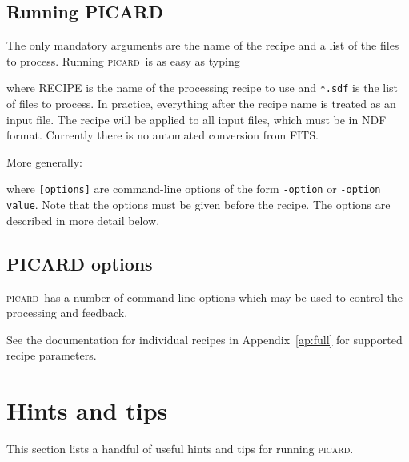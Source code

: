\documentclass[twoside,11pt,nolof]{starlink}
\providecommand{\picard}{\textsc{picard}}
\providecommand{\task}[1]{\textsf{#1}}
\begin{document}
\subsection{Running PICARD}

The only mandatory arguments are the name of the recipe and a list of
the files to process. Running \picard\ is as easy as typing
\begin{terminalv}
\end{terminalv}
where \task{RECIPE} is the name of the processing recipe to use and
\verb+*.sdf+ is the list of files to process. In practice, everything
after the recipe name is treated as an input file. The recipe will be
applied to all input files, which must be in NDF format. Currently
there is no automated conversion from FITS.

More generally:
\begin{terminalv}
\end{terminalv}
where \verb+[options]+ are command-line options of the form
\verb+-option+ or \verb+-option value+.  Note that the options must be
given before the recipe. The options are described in more detail
below.

\subsection{PICARD options}

\picard\ has a number of command-line options which may be used to
control the processing and feedback.



See the documentation for individual recipes in Appendix~\ref{ap:full}
for supported recipe parameters.

\section{Hints and tips\label{se:hints}}

This section lists a handful of useful hints and tips for running
\picard.
\end{document}

